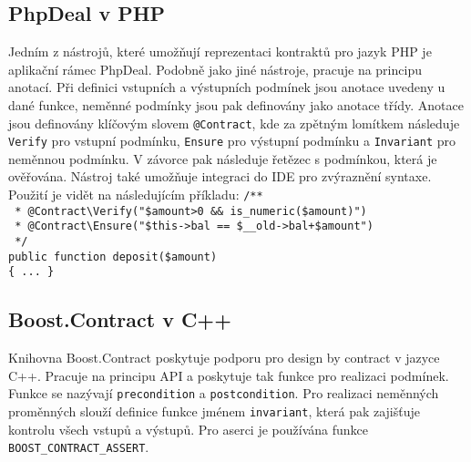 		\subsection{PhpDeal v PHP}
			Jedním z nástrojů, které umožňují reprezentaci kontraktů pro jazyk PHP je aplikační rámec PhpDeal. Podobně jako jiné nástroje, pracuje na principu anotací. Při definici vstupních a výstupních podmínek jsou anotace uvedeny u dané funkce, neměnné podmínky jsou pak definovány jako anotace třídy. Anotace jsou definovány klíčovým slovem \texttt{@Contract}, kde za zpětným lomítkem následuje \texttt{Verify} pro vstupní podmínku, \texttt{Ensure} pro výstupní podmínku a \texttt{Invariant} pro neměnnou podmínku. V závorce pak následuje řetězec s podmínkou, která je ověřována. Nástroj také umožňuje integraci do IDE pro zvýraznění syntaxe. Použití je vidět na následujícím příkladu:
			\- \- \- \- \- \texttt{/**}\\
			\- \- \- \- \- \texttt{ * @Contract\textbackslash Verify("\$amount\textgreater 0 \&\& is\_numeric(\$amount)")}\\	
			\- \- \- \- \- \texttt{ * @Contract\textbackslash Ensure("\$this-\textgreater bal == \$\_\_old-\textgreater bal+\$amount")}\\
			\- \- \- \- \- \texttt{ */}\\
			\- \- \- \- \- \texttt{public function deposit(\$amount)}\\
			\- \- \- \- \- \texttt{\{ ... \}}
		
		\subsection{Boost.Contract v C++}
			Knihovna Boost.Contract \cite{boostContract} poskytuje podporu pro design by contract v jazyce C++. Pracuje na principu API a poskytuje tak funkce pro realizaci podmínek. Funkce se nazývají \texttt{precondition} a \texttt{postcondition}. Pro realizaci neměnných proměnných slouží definice funkce jménem \texttt{invariant}, která pak zajišťuje kontrolu všech vstupů a výstupů. Pro aserci je používána funkce \texttt{BOOST\_CONTRACT\_ASSERT}.
			
		
